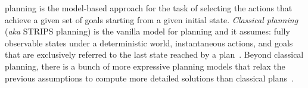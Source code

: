\documentclass[10pt,journal,compsoc]{IEEEtran}
\begin{document}
%
\IEEEpeerreviewmaketitle







% 
% 
% 
% 

 planning is the model-based approach for the task of selecting the actions that achieve a given set of goals starting from a given initial state. {\em Classical planning} (\textit{aka} STRIPS planning) is the vanilla model for planning and it assumes: fully observable states under a deterministic world, instantaneous actions, and goals that are exclusively referred to the last state reached by a plan~\cite{geffner2013concise,ghallab2004automated}. Beyond classical planning, there is a bunch of more expressive planning models that relax the previous assumptions to compute more detailed solutions than classical plans~\cite{ghallab2004automated}.
\end{document}
